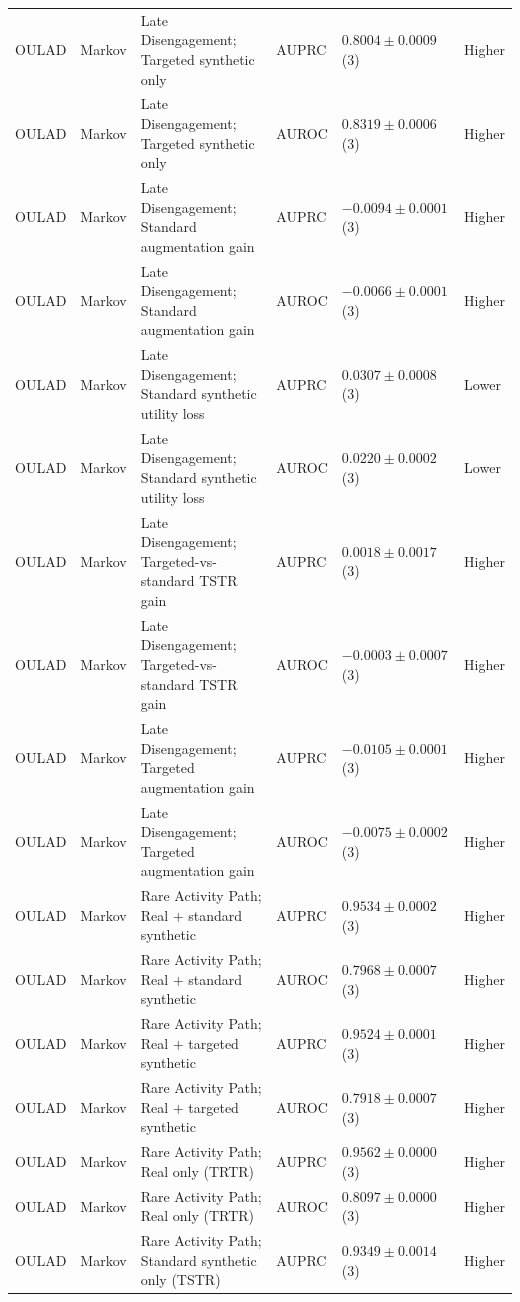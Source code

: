 \begin{longtable}{@{}p{2.25cm}p{2.05cm}p{4.7cm}p{5.0cm}p{2.6cm}p{1.25cm}@{}}
OULAD & Markov & Late Disengagement; Targeted synthetic only & AUPRC & $0.8004 \mathbin{\pm} 0.0009$ (3) & Higher \\
OULAD & Markov & Late Disengagement; Targeted synthetic only & AUROC & $0.8319 \mathbin{\pm} 0.0006$ (3) & Higher \\
OULAD & Markov & Late Disengagement; Standard augmentation gain & AUPRC & $-0.0094 \mathbin{\pm} 0.0001$ (3) & Higher \\
OULAD & Markov & Late Disengagement; Standard augmentation gain & AUROC & $-0.0066 \mathbin{\pm} 0.0001$ (3) & Higher \\
OULAD & Markov & Late Disengagement; Standard synthetic utility loss & AUPRC & $0.0307 \mathbin{\pm} 0.0008$ (3) & Lower \\
OULAD & Markov & Late Disengagement; Standard synthetic utility loss & AUROC & $0.0220 \mathbin{\pm} 0.0002$ (3) & Lower \\
OULAD & Markov & Late Disengagement; Targeted-vs-standard TSTR gain & AUPRC & $0.0018 \mathbin{\pm} 0.0017$ (3) & Higher \\
OULAD & Markov & Late Disengagement; Targeted-vs-standard TSTR gain & AUROC & $-0.0003 \mathbin{\pm} 0.0007$ (3) & Higher \\
OULAD & Markov & Late Disengagement; Targeted augmentation gain & AUPRC & $-0.0105 \mathbin{\pm} 0.0001$ (3) & Higher \\
OULAD & Markov & Late Disengagement; Targeted augmentation gain & AUROC & $-0.0075 \mathbin{\pm} 0.0002$ (3) & Higher \\
OULAD & Markov & Rare Activity Path; Real + standard synthetic & AUPRC & $0.9534 \mathbin{\pm} 0.0002$ (3) & Higher \\
OULAD & Markov & Rare Activity Path; Real + standard synthetic & AUROC & $0.7968 \mathbin{\pm} 0.0007$ (3) & Higher \\
OULAD & Markov & Rare Activity Path; Real + targeted synthetic & AUPRC & $0.9524 \mathbin{\pm} 0.0001$ (3) & Higher \\
OULAD & Markov & Rare Activity Path; Real + targeted synthetic & AUROC & $0.7918 \mathbin{\pm} 0.0007$ (3) & Higher \\
OULAD & Markov & Rare Activity Path; Real only (TRTR) & AUPRC & $0.9562 \mathbin{\pm} 0.0000$ (3) & Higher \\
OULAD & Markov & Rare Activity Path; Real only (TRTR) & AUROC & $0.8097 \mathbin{\pm} 0.0000$ (3) & Higher \\
OULAD & Markov & Rare Activity Path; Standard synthetic only (TSTR) & AUPRC & $0.9349 \mathbin{\pm} 0.0014$ (3) & Higher \\

\end{longtable}
